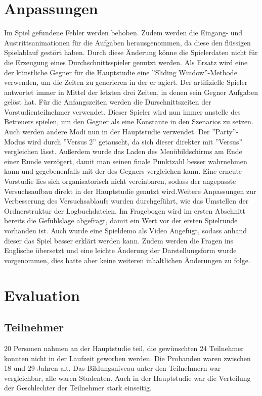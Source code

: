 \section{Anpassungen}
Im Spiel gefundene Fehler werden behoben. Zudem werden die Eingang- und Austrittsanimationen für die Aufgaben herausgenommen, da diese den flüssigen Spielablauf gestört haben. Durch diese Änderung könne die Spielerdaten nicht für die Erzeugung eines Durchschnittsspieler genutzt werden. Als Ersatz wird eine der künstliche Gegner für die Hauptstudie  eine ''Sliding Window''-Methode verwenden, um die Zeiten zu generieren in der er agiert. Der artifizielle Spieler antwortet immer in Mittel der letzten drei Zeiten, in denen sein Gegner Aufgaben gelöst hat. Für die Anfangszeiten werden die Durschnittszeiten der Vorstudienteilnehmer verwendet. Dieser Spieler wird nun immer anstelle des Betreuers spielen, um den Gegner als eine Konstante in den Szenarios zu setzen. Auch werden andere Modi nun in der Hauptstudie verwendet. Der ''Party''-Modus wird durch ''Versus 2'' getauscht, da sich dieser direkter mit ''Versus'' vergleichen lässt. Außerdem wurde das Laden des Menübildschirms am Ende einer Runde verzögert, damit man seinen finale Punktzahl besser wahrnehmen kann und gegebenenfalls mit der des Gegners vergleichen kann. Eine erneute Vorstudie lies sich organisatorisch nicht vereinbaren, sodass der angepasste Versuchsaufbau direkt in der Hauptstudie genutzt wird.\newline Weitere Anpassungen zur Verbesserung des Versuchsablaufs wurden durchgeführt, wie das Umstellen der Ordnerstruktur der Logbuchdateien. Im Fragebogen wird im ersten Abschnitt bereits die Gefühlslage abgefragt, damit ein Wert vor der ersten Spielrunde vorhanden ist. Auch wurde eine Spieldemo als Video Angefügt, sodass anhand dieser das Spiel besser erklärt werden kann. Zudem werden die Fragen ins Englische übersetzt und eine leichte Änderung der Darstellungsform wurde vorgenommen, dies hatte aber keine weiteren inhaltlichen Änderungen zu folge.
\section{Evaluation}
\subsection{Teilnehmer}
20 Personen nahmen an der Hauptstudie teil, die gewünschten 24 Teilnehmer konnten nicht in der Laufzeit geworben werden. Die Probanden waren zwischen 18 und 29 Jahren alt. Das Bildungsniveau unter den Teilnehmern war vergleichbar, alle waren Studenten. Auch in der Hauptstudie war die Verteilung der Geschlechter der Teilnehmer stark einseitig.
